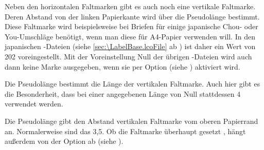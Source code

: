 \begin{Declaration}
\end{Declaration}
Neben den horizontalen Faltmarken gibt es
auch noch eine vertikale Faltmarke. Deren Abstand von der linken Papierkante
wird über die Pseudolänge  bestimmt. Diese Faltmarke
wird beispielsweise bei Briefen für einige japanische Chou- oder You-Umschläge
benötigt, wenn man diese für A4-Papier verwenden
will. In den japanischen
-Dateien (siehe
\autoref{sec:\LabelBase.lcoFile} ab ) ist
daher ein Wert von 202 voreingestellt. Mit der Voreinstellung Null
der übrigen -Dateien wird auch dann keine Marke ausgegeben, wenn sie
per Option %
%
 (siehe
) aktiviert wird.%
\EndIndexGroup


\begin{Declaration}
\end{Declaration}
Die Pseudolänge  bestimmt
die Länge der vertikalen
Faltmarke. Auch  hier gibt es die Besonderheit, dass bei
einer angegebenen Länge von Null stattdessen 4 verwendet werden.%
\EndIndexGroup


\begin{Declaration}
\end{Declaration}
Die Pseudolänge gibt den Abstand
 vertikalen Faltmarke vom oberen Papier\-rand
an. Normalerweise sind das 3{,}5. %
\iffalse%
Sie\textnote{Tipp!} können den Wert aber auch in Ihrer eigenen
\File{lco}-Datei ändern, falls Sie einen Drucker verwenden, der einen
breiteren unbedruckbaren oberen Rand hat. %
\fi%
Ob die Faltmarke überhaupt gesetzt , hängt
außerdem von der Option %
%
 ab (siehe
).%
\EndIndexGroup


